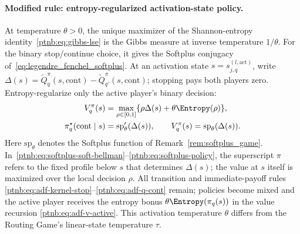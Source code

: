 \paragraph{Modified rule: entropy-regularized activation-state policy.}\label{ptnb:app:softplus-rules}
At temperature $\theta>0$, the unique maximizer of the Shannon-entropy identity~\eqref{ptnb:eq:gibbs-lse} is the Gibbs measure at inverse temperature $1/\theta$. For the binary stop/continue choice, it gives the Softplus
conjugacy of~\eqref{eq:legendre_fenchel_softplus}.
At an activation state $s=s_{j,q}^{(l,\mathrm{act})}$, write
$\Delta(s)=\tilde Q_q^\pi(s,\mathrm{cont})-\tilde Q_{q'}^\pi(s,\mathrm{cont})$; stopping pays both
players zero. Entropy-regularize only the active player's binary decision:
\begin{align}
    V_q^\pi(s)&=\max_{\rho\in[0,1]}\{\rho\Delta(s)+\theta\Entropy(\rho)\},\label{ptnb:eq:softplus-soft-bellman}\\
    \pi_q^\star(\mathrm{cont}\mid s)&=\mathrm{sp}'_\theta(\Delta(s)),\qquad
    V_q^\pi(s)=\mathrm{sp}_\theta(\Delta(s)).\label{ptnb:eq:softplus-policy}
\end{align}
Here $\mathrm{sp}_\theta$ denotes the Softplus function of Remark~\ref{rem:softplus_game}. In~\eqref{ptnb:eq:softplus-soft-bellman}--\eqref{ptnb:eq:softplus-policy}, the superscript $\pi$ refers to the fixed profile below $s$ that determines $\Delta(s)$; the value at $s$ itself is maximized over the local decision $\rho$. All transition and immediate-payoff rules
\eqref{ptnb:eq:adf-kernel-stop}--\eqref{ptnb:eq:adf-q-cont} remain; policies become mixed and the
active player receives the entropy bonus $\theta\Entropy(\pi_q(s))$ in the value recursion
\eqref{ptnb:eq:adf-v-active}. This activation temperature $\theta$ differs from the Routing Game's
linear-state temperature $\tau$.

